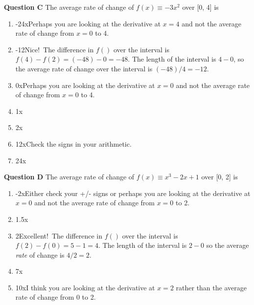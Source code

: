 \documentclass[
  letterpaper,
  DIV=11,
  numbers=noendperiod,
  oneside]{article}
\providecommand{\tightlist}{%
  \setlength{\itemsep}{0pt}\setlength{\parskip}{0pt}}\usepackage{longtable,booktabs,array}
\begin{document}
\begin{multicols}{2}
\textbf{Question C} The average rate of change of \(f(x) \equiv -3 x^2\)
over {[}0, 4{]} is

\begin{enumerate}
\def\labelenumi{\roman{enumi}.}
\tightlist
\item
  {-24{xPerhaps you are looking at the derivative at \(x=4\) and not
  the average rate of change from \(x=0\) to 4.}}\\
\item
  {-12{Nice!~The difference in \(f()\) over the interval is
  \(f(4) - f(2) = (-48) - 0 = -48\). The length of the interval is
  \(4-0\), so the average rate of change over the interval is
  \((-48)/4 = -12\).}}\\
\item
  {0{xPerhaps you are looking at the derivative at \(x=0\) and not the
  average rate of change from \(x=0\) to 4.}}\\
\item
  {1{x}}\\
\item
  {2{x}}\\
\item
  {12{xCheck the signs in your arithmetic.}}\\
\item
  {24{x}}
\end{enumerate}

\textbf{Question D} The average rate of change of
\(f(x) \equiv x^3 - 2 x + 1\) over {[}0, 2{]} is

\begin{enumerate}
\def\labelenumi{\roman{enumi}.}
\tightlist
\item
  {-2{xEither check your +/- signs or perhaps you are looking at the
  derivative at \(x=0\) and not the average rate of change from \(x=0\)
  to 2.}}\\
\item
  {1.5{x}}\\
\item
  {2{Excellent!~The difference in \(f()\) over the interval is
  \(f(2) - f(0) = 5 - 1 = 4\). The length of the interval is \(2 - 0\)
  so the average \emph{rate} of change is \(4/2 = 2\). }}\\
\item
  {7{x}}\\
\item
  {10{xI think you are looking at the derivative at \(x=2\) rather
  than the average rate of change from 0 to 2.}}
\end{enumerate}


\end{multicols}
\end{document}

